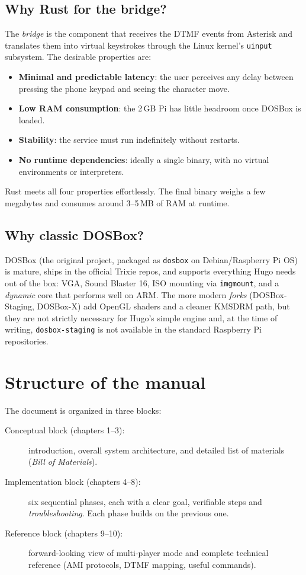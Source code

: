 \subsection{Why Rust for the bridge?}

The \emph{bridge} is the component that receives the DTMF events from Asterisk and translates them into virtual keystrokes through the Linux kernel's \texttt{uinput} subsystem. The desirable properties are:

\begin{itemize}
  \item \textbf{Minimal and predictable latency}: the user perceives any delay between pressing the phone keypad and seeing the character move.
  \item \textbf{Low RAM consumption}: the 2\,GB Pi has little headroom once DOSBox is loaded.
  \item \textbf{Stability}: the service must run indefinitely without restarts.
  \item \textbf{No runtime dependencies}: ideally a single binary, with no virtual environments or interpreters.
\end{itemize}

Rust meets all four properties effortlessly. The final binary weighs a few megabytes and consumes around 3--5\,MB of RAM at runtime.

\subsection{Why classic DOSBox?}

DOSBox (the original project, packaged as \texttt{dosbox} on Debian/Raspberry Pi OS) is mature, ships in the official Trixie repos, and supports everything Hugo needs out of the box: VGA, Sound Blaster 16, ISO mounting via \texttt{imgmount}, and a \emph{dynamic} core that performs well on ARM. The more modern \emph{forks} (DOSBox-Staging, DOSBox-X) add OpenGL shaders and a cleaner KMSDRM path, but they are not strictly necessary for Hugo's simple engine and, at the time of writing, \texttt{dosbox-staging} is not available in the standard Raspberry Pi repositories.

\section{Structure of the manual}

The document is organized in three blocks:

\begin{description}
  \item[Conceptual block (chapters 1--3):] introduction, overall system architecture, and detailed list of materials (\emph{Bill of Materials}).
  \item[Implementation block (chapters 4--8):] six sequential phases, each with a clear goal, verifiable steps and \emph{troubleshooting}. Each phase builds on the previous one.
  \item[Reference block (chapters 9--10):] forward-looking view of multi-player mode and complete technical reference (AMI protocols, DTMF mapping, useful commands).
\end{description}

